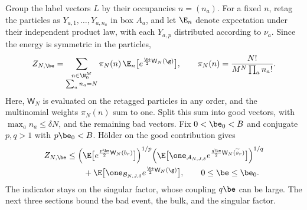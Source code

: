 Group the label vectors $L$ by their occupancies $n=(n_a)$.  For a fixed $n$, retag the particles as $Y_{a,1},\ldots,Y_{a,n_a}$ in box $A_a$, and let $\E_n$ denote expectation under their independent product law, with each $Y_{a,p}$ distributed according to $\nu_a$.  Since the energy is symmetric in the particles,
\begin{equation}
 Z_{N,\be}
 =\sum_{\substack{n\in\N_0^M\\\sum_a n_a=N}}
   \pi_N(n)\,\E_n\big[e^{\frac\be2\mathsf W_N(\g)}\big],
 \qquad
 \pi_N(n)=\frac{N!}{M^N\prod_a n_a!}.
 \label{eq:partition-occupancy-sum}
\end{equation}
Here, $\mathsf W_N$ is evaluated on the retagged particles in any order, and the multinomial weights $\pi_N(n)$ sum to one.  Split this sum into good vectors, with $\max_a n_a\le\delta N$, and the remaining bad vectors.  Fix $0<\be_0<B$ and conjugate $p,q>1$ with $p\be_0<B$.  H\"older on the good contribution gives
\begin{equation}
 \begin{aligned}
 Z_{N,\be}
 &\le
 \Big(\E\big[e^{\frac{p\be}{2}\mathsf W_N(b_r)}\big]\Big)^{1/p}
 \Big(\E\big[\one_{\mathcal A_{N,J,\delta}}
        e^{\frac{q\be}{2}\mathsf W_N(\widetilde s_r)}\big]\Big)^{1/q}\\
 &\qquad+\E\big[\one_{\mathcal B_{N,J,\delta}}
                     e^{\frac\be2\mathsf W_N(\g)}\big],
 \qquad 0\le\be\le\be_0.
 \end{aligned}
 \label{eq:physical-cutoff-holder}
\end{equation}
The indicator stays on the singular factor, whose coupling $q\be$ can be large.  The next three sections bound the bad event, the bulk, and the singular factor.
